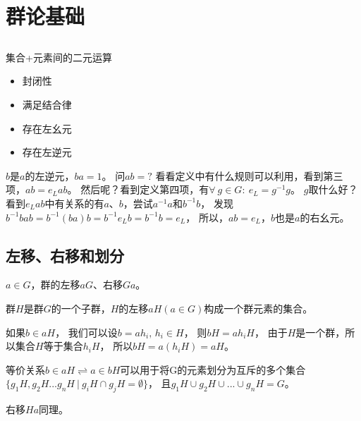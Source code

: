 \section{群论基础}

\subsection{}

\noindent 集合+元素间的二元运算
\begin{itemize}
    \item 封闭性
    \item 满足结合律
    \item 存在左幺元
    \item 存在左逆元
\end{itemize}

$b$是$a$的左逆元，$ba=1$。
问$ab=?$
看看定义中有什么规则可以利用，看到第三项，$ab=e_{L}ab$。
然后呢？看到定义第四项，有$\forall\ g\in G:\ e_{L}=g^{-1}g$。
$g$取什么好？看到$e_{L}ab$中有关系的有$a$、$b$，尝试$a^{-1}a$和$b^{-1}b$，
发现$b^{-1}bab=b^{-1}(ba)b=b^{-1}e_{L}b=b^{-1}b=e_{L}$，
所以，$ab=e_{L}$，$b$也是$a$的右幺元。

\subsection{左移、右移和划分}

$a\in G$，群的左移$aG$、右移$Ga$。

群$H$是群$G$的一个子群，$H$的左移$aH(a\in G)$构成一个群元素的集合。

如果$b\in aH$，
我们可以设$b= ah_{i},\,h_{i}\in H$，
则$bH=ah_{i}H$，
由于$H$是一个群，所以集合$H$等于集合$h_{i}H$，
所以$bH=a(h_{i}H)=aH$。

等价关系$b\in aH\rightleftharpoons a\in bH$可以用于将G的元素划分为互斥的多个集合
$\{g_{1}H,g_{2}H...g_{n}H\ |\ g_{i}H\cap g_{j}H=\emptyset\}$，
且$g_{1}H\cup g_{2}H\cup ...\cup g_{n}H=G$。

右移$Ha$同理。


